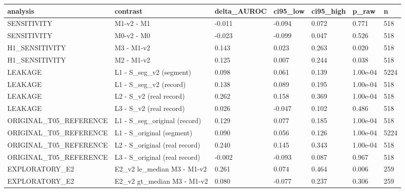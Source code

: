 \begin{tabular}{lllllll}
\toprule
analysis & contrast & delta\_AUROC & ci95\_low & ci95\_high & p\_raw & n \\
\midrule
SENSITIVITY & M1-v2 - M1 & -0.011 & -0.094 & 0.072 & 0.771 & 518 \\
SENSITIVITY & M0-v2 - M0 & -0.023 & -0.099 & 0.047 & 0.526 & 518 \\
H1\_SENSITIVITY & M3 - M1-v2 & 0.143 & 0.023 & 0.263 & 0.020 & 518 \\
H1\_SENSITIVITY & M2 - M1-v2 & 0.125 & 0.007 & 0.244 & 0.038 & 518 \\
LEAKAGE & L1 - S\_seg\_v2 (segment) & 0.098 & 0.061 & 0.139 & 1.00e-04 & 5224 \\
LEAKAGE & L1 - S\_seg\_v2 (record) & 0.138 & 0.089 & 0.195 & 1.00e-04 & 518 \\
LEAKAGE & L2 - S\_v2 (real record) & 0.262 & 0.158 & 0.369 & 1.00e-04 & 518 \\
LEAKAGE & L3 - S\_v2 (real record) & 0.026 & -0.047 & 0.102 & 0.486 & 518 \\
ORIGINAL\_T05\_REFERENCE & L1 - S\_seg\_original (record) & 0.129 & 0.077 & 0.185 & 1.00e-04 & 518 \\
ORIGINAL\_T05\_REFERENCE & L1 - S\_original (segment) & 0.090 & 0.056 & 0.126 & 1.00e-04 & 5224 \\
ORIGINAL\_T05\_REFERENCE & L2 - S\_original (real record) & 0.240 & 0.145 & 0.343 & 1.00e-04 & 518 \\
ORIGINAL\_T05\_REFERENCE & L3 - S\_original (real record) & -0.002 & -0.093 & 0.087 & 0.967 & 518 \\
EXPLORATORY\_E2 & E2\_v2 le\_median M3 - M1-v2 & 0.261 & 0.074 & 0.464 & 0.006 & 259 \\
EXPLORATORY\_E2 & E2\_v2 gt\_median M3 - M1-v2 & 0.080 & -0.077 & 0.237 & 0.306 & 259 \\
\bottomrule
\end{tabular}
